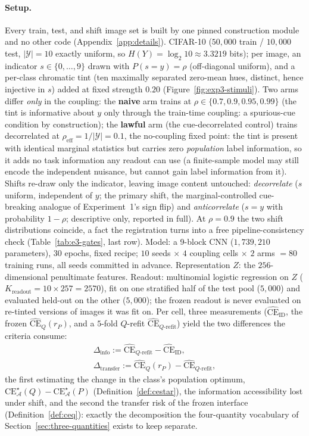 \documentclass[twocolumn,10pt]{article}
\theoremstyle{definition}
\theoremstyle{remark}
\newcommand{\cA}{\mathcal{A}}
\newcommand{\cY}{\mathcal{Y}}
\newcommand{\CE}{\mathrm{CE}}
\newcommand{\rP}{r_{P}}
\newcommand{\CEhat}{\widehat{\CE}}
\begin{document}
\paragraph{Setup.} Every train, test, and shift image set is built by
one pinned construction module and no other code
(Appendix~\ref{app:details}). CIFAR-10 ($50{,}000$ train / $10{,}000$
test, $|\cY| = 10$ exactly uniform, so
$H(Y) = \log_2 10 \approx 3.3219$ bits); per image, an indicator
$s \in \{0, \dots, 9\}$ drawn with $P(s = y) = \rho$ (off-diagonal
uniform), and a per-class chromatic tint (ten maximally separated
zero-mean hues, distinct, hence injective in $s$) added at fixed
strength $0.20$ (Figure~\ref{fig:exp3-stimuli}). Two arms differ
\emph{only} in the coupling: the
\textbf{naive} arm trains at $\rho \in \{0.7, 0.9, 0.95, 0.99\}$ (the
tint is informative about $y$ only through the train-time coupling:
a spurious-cue condition by construction); the \textbf{lawful} arm (the
cue-decorrelated control) trains
decorrelated at $\rho_{\mathrm{eff}} = 1/|\cY| = 0.1$, the no-coupling
fixed point: the tint is present with identical marginal statistics
but carries zero \emph{population} label information, so it adds no task
information any readout can use (a finite-sample model may still encode
the independent nuisance, but cannot gain label information from it).
Shifts re-draw only the indicator, leaving image
content untouched: \emph{decorrelate} ($s$ uniform, independent of
$y$; the primary shift, the marginal-controlled cue-breaking analogue
of Experiment~1's sign flip) and \emph{anticorrelate} ($s = y$ with
probability $1 - \rho$; descriptive only, reported in full). At
$\rho = 0.9$ the two shift distributions coincide, a fact the
registration turns into a free pipeline-consistency check
(Table~\ref{tab:e3-gates}, last row). Model:
a 9-block CNN ($1{,}739{,}210$ parameters), $30$ epochs, fixed recipe;
$10$ seeds $\times$ $4$ coupling cells $\times$ $2$ arms $= 80$
training runs, all seeds committed in advance. Representation $Z$: the
$256$-dimensional penultimate features. Readout: multinomial logistic
regression on $Z$ ($K_{\mathrm{readout}} = 10 \times 257 = 2570$), fit
on one stratified half of the test pool ($5{,}000$) and evaluated
held-out on the other ($5{,}000$); the frozen readout is never
evaluated on re-tinted versions of images it was fit on. Per cell,
three measurements ($\CEhat_{\mathrm{ID}}$, the frozen
$\CEhat_Q(\rP)$, and a $5$-fold $Q$-refit
$\CEhat_{Q\text{-refit}}$) yield the two differences the criteria
consume:
\begin{gather*}
\Delta_{\mathrm{info}} := \CEhat_{Q\text{-refit}} - \CEhat_{\mathrm{ID}},
\\
\Delta_{\mathrm{transfer}} := \CEhat_Q(\rP) - \CEhat_{Q\text{-refit}},
\end{gather*}
the first estimating the change in the class's population optimum,
$\CE^{\star}_{\cA}(Q) - \CE^{\star}_{\cA}(P)$
(Definition~\ref{def:cestar}), the information accessibility lost
under shift, and the second the transfer risk of the frozen interface
(Definition~\ref{def:ceq}): exactly the decomposition the four-quantity
vocabulary of Section~\ref{sec:three-quantities} exists to keep
separate.
\end{document}
